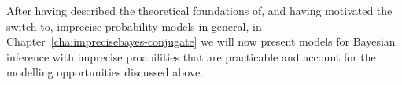 \medskip

After having described the theoretical foundations of, and having motivated the switch to, imprecise probability models in general,
in Chapter~\ref{cha:imprecisebayes-conjugate} we will now present 
models for Bayesian inference with imprecise proabilities
that are practicable and account for the modelling opportunities discussed above. %


